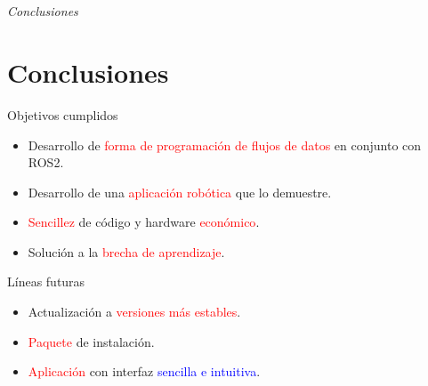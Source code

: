 \documentclass{beamer}
\begin{document}
\section*{}
\begin{frame}{}
  \centering \Huge
  \emph{Conclusiones}
\end{frame}

\section{Conclusiones}
\begin{frame}
\begin{block}{Objetivos cumplidos}
\begin{itemize}
\item Desarrollo de \textcolor{red}{forma de programación de flujos de datos} en conjunto con ROS2.
\item Desarrollo de una \textcolor{red}{aplicación robótica} que lo demuestre.
\item \textcolor{red}{Sencillez} de código y hardware \textcolor{red}{económico}.
\item Solución a la \textcolor{red}{brecha de aprendizaje}.
\end{itemize}
\end{block}

\begin{block}{Líneas futuras}
\begin{itemize}
\item Actualización a \textcolor{red}{versiones más estables}.
\item \textcolor{red}{Paquete} de instalación.
\item \textcolor{red}{Aplicación} con interfaz \textcolor{blue}{sencilla e intuitiva}.
\end{itemize}
\end{block}
\end{frame}

\begin{frame}[plain]
\large{\titlepage}
\end{frame}
\end{document}
